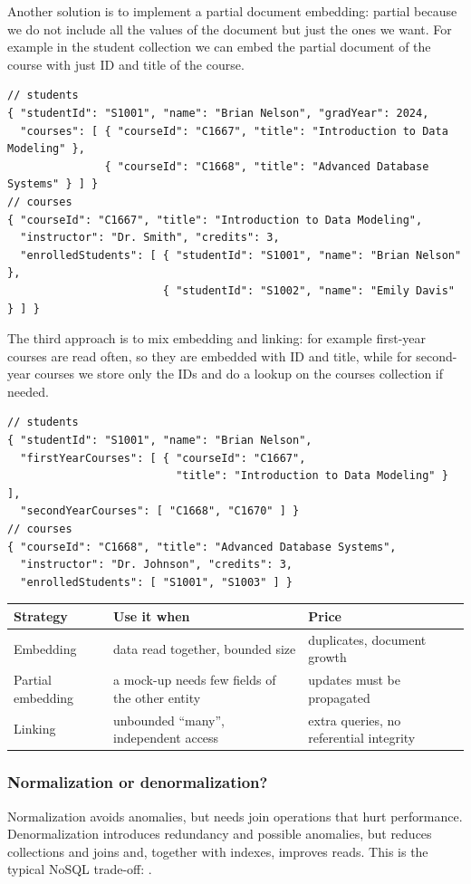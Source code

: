 Another solution is to implement a partial document embedding: partial because we do not include all the values of the document but just the ones we want. For example in the student collection we can embed the partial document of the course with just ID and title of the course.
\begin{lstlisting}
// students
{ "studentId": "S1001", "name": "Brian Nelson", "gradYear": 2024,
  "courses": [ { "courseId": "C1667", "title": "Introduction to Data Modeling" },
               { "courseId": "C1668", "title": "Advanced Database Systems" } ] }
// courses
{ "courseId": "C1667", "title": "Introduction to Data Modeling",
  "instructor": "Dr. Smith", "credits": 3,
  "enrolledStudents": [ { "studentId": "S1001", "name": "Brian Nelson" },
                        { "studentId": "S1002", "name": "Emily Davis" } ] }
\end{lstlisting}

The third approach is to mix embedding and linking: for example first-year courses are read often, so they are embedded with ID and title, while for second-year courses we store only the IDs and do a lookup on the courses collection if needed.
\begin{lstlisting}
// students
{ "studentId": "S1001", "name": "Brian Nelson",
  "firstYearCourses": [ { "courseId": "C1667",
                          "title": "Introduction to Data Modeling" } ],
  "secondYearCourses": [ "C1668", "C1670" ] }
// courses
{ "courseId": "C1668", "title": "Advanced Database Systems",
  "instructor": "Dr. Johnson", "credits": 3,
  "enrolledStudents": [ "S1001", "S1003" ] }
\end{lstlisting}

\begin{center}\small
\begin{tabular}{p{3cm}p{5cm}p{5.5cm}}
\toprule
\textbf{Strategy} & \textbf{Use it when} & \textbf{Price} \\
\midrule
Embedding & data read together, bounded size & duplicates, document growth \\
Partial embedding & a mock-up needs few fields of the other entity & updates must be propagated \\
Linking & unbounded ``many'', independent access & extra queries, no referential integrity \\
\bottomrule
\end{tabular}
\end{center}

\subsubsection{Normalization or denormalization?}
Normalization avoids anomalies, but needs join operations that hurt performance. Denormalization introduces redundancy and possible anomalies, but reduces collections and joins and, together with indexes, improves reads. This is the typical NoSQL trade-off: .

